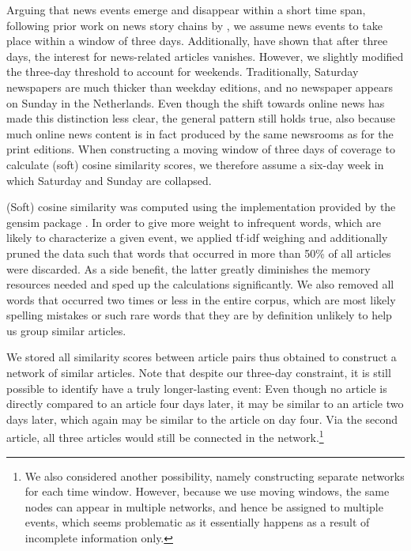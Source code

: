 \documentclass[a4paper,man,natbib,floatsintext,mask]{apa6}
\begin{document}
Arguing that news events emerge and disappear within a short time span, following prior work on news story chains by \citet{Nicholls2018}, we assume news events to take place within a window of three days. Additionally, \citet{Castillo2014} have shown that after three days, the interest for news-related articles vanishes.
However, we slightly modified the three-day threshold to account for weekends.
Traditionally, Saturday newspapers are much thicker than weekday editions, and no newspaper appears on Sunday in the Netherlands. 
Even though the shift towards online news has made this distinction less clear, the general pattern still holds true, also because much online news content is in fact produced by the same newsrooms as for the print editions.
When constructing a moving window of three days of coverage to calculate (soft) cosine similarity scores, we therefore assume a six-day  week in which Saturday and Sunday are collapsed.

(Soft) cosine similarity was computed using the implementation provided by the gensim package \citep{gensim,gensimsoftcosine}.
In order to give more weight to infrequent words, which are likely to characterize a given event, we applied tf$\cdot$idf weighing and additionally pruned the data such that words that occurred in more than 50\% of all articles were discarded. As a side benefit, the latter greatly diminishes the memory resources needed and sped up the calculations significantly. We also removed all words that occurred two times or less in the entire corpus, which are most likely spelling mistakes or such rare words that they are by definition unlikely to help us group similar articles.

We stored all similarity scores between article pairs thus obtained to construct a network of similar articles.
Note that despite our three-day constraint, it is still possible to identify have a truly longer-lasting event: Even though no article is directly compared to an article four days later, it may be similar to an article two days later, which again may be similar to the article on day four. Via the second article, all three articles would still be connected in the network.\footnote{We also considered another possibility, namely constructing separate networks for each time window. However, because we use moving windows, the same nodes can appear in multiple networks, and hence be assigned to multiple events, which seems problematic as it essentially happens as a result of incomplete information only.}
\end{document}
